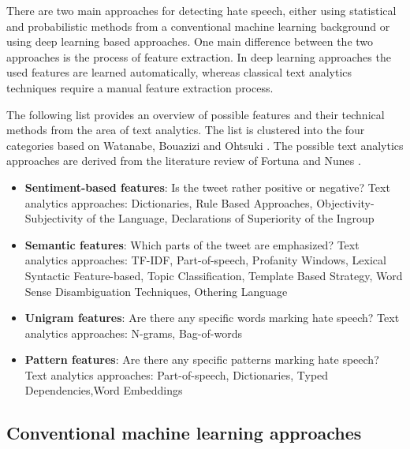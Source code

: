 There are two main approaches for detecting hate speech, either using statistical and probabilistic methods from a conventional machine learning background or using deep learning based approaches. One main difference between the two approaches is the process of feature extraction. In deep learning approaches the used features are learned automatically, whereas classical text analytics techniques require a manual feature extraction process.

The following list provides an overview of possible features and their technical methods from the area of text analytics. The list is clustered into the four categories based on Watanabe, Bouazizi and Ohtsuki \cite{Watanabe.2018}. The possible text analytics approaches are derived from the literature review of Fortuna and Nunes \cite{Fortuna.2018}.
\begin{itemize}
	\item \textbf{Sentiment-based features}: Is the tweet rather positive or negative? \newline
	Text analytics approaches: Dictionaries, Rule Based Approaches, Ob\-jec\-ti\-vi\-ty-Subjectivity of the Language, Declarations of Superiority of the Ingroup \cite{Fortuna.2018}
	\item \textbf{Semantic features}: Which parts of the tweet are emphasized? \newline
	Text analytics approaches: TF-IDF, Part-of-speech, Profanity Windows, Lexical Syntactic Feature-based, Topic Classification, Template Based Strategy, Word Sense Disambiguation Techniques, Othering Language \cite{Fortuna.2018}
	\item \textbf{Unigram features}: Are there any specific words marking hate speech? \newline
	Text analytics approaches: N-grams, Bag-of-words \cite{Fortuna.2018}
	\item \textbf{Pattern features}: Are there any specific patterns marking hate speech? \newline
	Text analytics approaches: Part-of-speech, Dictionaries, Typed De\-pen\-den\-cies,Word Embeddings \cite{Fortuna.2018}
\end{itemize}


\subsection{Conventional machine learning approaches}

